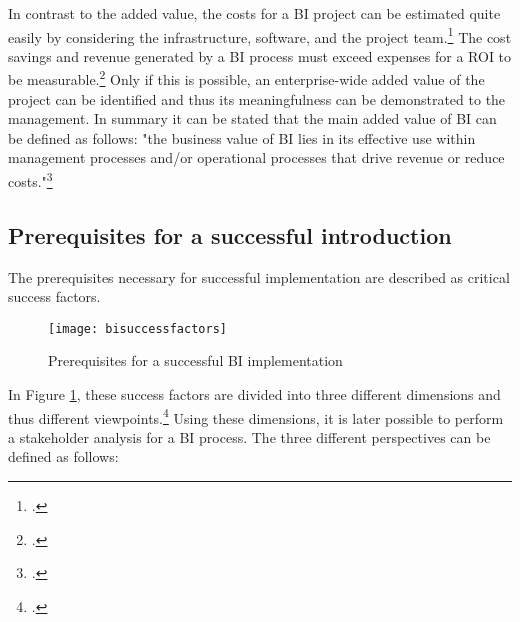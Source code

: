 In contrast to the added value, the costs for a \ac{BI} project can be estimated quite easily by considering the infrastructure,
software, and the project team.\footcite[Cf.][p. 98]{hovcevar2010assessing} The cost savings
and revenue generated by a \ac{BI} process must exceed expenses for a \ac{ROI} to be measurable.\footcite[Cf.][p. 8]{williams2003business}
Only if this is possible, an enterprise-wide added value of the project can be
identified and thus its meaningfulness can be demonstrated to the management. In summary it
can be stated that the main added value of BI can be defined as follows: "the business value of BI lies in
its effective use within management processes and/or operational processes that drive revenue or reduce
costs."\footcite[][p. 7]{williams2003business}

\subsection{Prerequisites for a successful introduction} \label{toc:einfuehrungsstrategien}

The prerequisites necessary for successful implementation are described as critical success factors.

\begin{figure}[H]
    \caption{Prerequisites for a successful BI implementation}
    \texttt{[image: bisuccessfactors]}
    \label{figure:bisuccessfactors}
    \\
    \cite[Source: Based on][Fig. 1]{yeoh2010critical}
\end{figure}

In Figure \ref{figure:bisuccessfactors}, these success factors are divided into three different dimensions and thus different
viewpoints.\footcite[Cf.][pp. 26]{yeoh2010critical} Using these dimensions, it is later possible to perform a
stakeholder analysis for a \ac{BI} process. The three different perspectives can be defined as follows:

